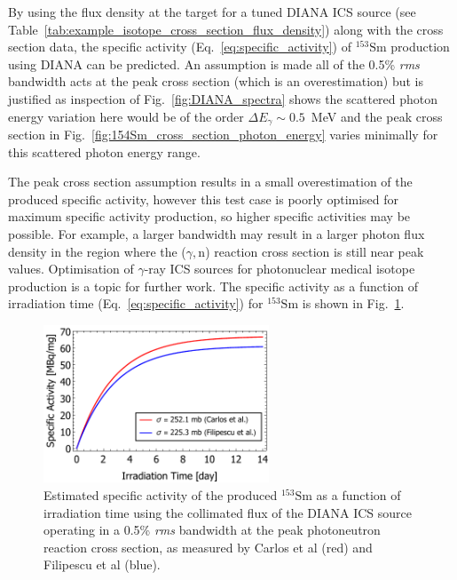 \documentclass[../main.tex]{subfiles}
\begin{document}
By using the flux density at the target for a tuned DIANA ICS source (see Table~\ref{tab:example_isotope_cross_section_flux_density}) along with the cross section data, the specific activity (Eq.~\ref{eq:specific_activity}) of $^{153}\mathrm{Sm}$ production using DIANA can be predicted. An assumption is made all of the 0.5\% \textit{rms} bandwidth acts at the peak cross section (which is an overestimation) but is justified as inspection of Fig.~\ref{fig:DIANA_spectra} shows the scattered photon energy variation here would be of the order $\Delta E_{\gamma}\sim0.5$~\si{\mega\electronvolt} and the peak cross section in Fig.~\ref{fig:154Sm_cross_section_photon_energy} varies minimally for this scattered photon energy range. 

The peak cross section assumption results in a small overestimation of the produced specific activity, however this test case is poorly optimised for maximum specific activity production, so higher specific activities may be possible. For example, a larger bandwidth may result in a larger photon flux density in the region where the ($\gamma,\mathrm{n}$) reaction cross section is still near peak values. Optimisation of $\gamma$-ray ICS sources for photonuclear medical isotope production is a topic for further work. The specific activity as a function of irradiation time (Eq.~\ref{eq:specific_activity}) for $^{153}\mathrm{Sm}$ is shown in Fig.~\ref{fig:153Sm_specific_activity}.
\begin{figure}[!h]
\centering
\includegraphics[width=0.6\textwidth]{Figures/DIANA_Inverse_Compton_Source_Design/154Sm_specific_activity.pdf}
\caption{Estimated specific activity of the produced $^{153}\mathrm{Sm}$ as a function of irradiation time using the collimated flux of the DIANA ICS source operating in a 0.5\% \textit{rms} bandwidth at the peak photoneutron reaction cross section, as measured by Carlos et al \cite{carlos1974giant} (red) and Filipescu et al \cite{filipescu2014photoneutron} (blue).}
\label{fig:153Sm_specific_activity}
\end{figure}
\end{document}
